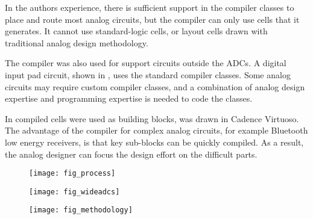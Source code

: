 {In the authors experience, there is sufficient support in the compiler classes
to place and route most analog circuits, but the compiler can only use
cells that it generates. It cannot use standard-logic cells, or
layout cells drawn with traditional analog design methodology.

The compiler was also used for support circuits
outside the ADCs. A digital input pad circuit, shown in , uses the standard compiler
classes. Some analog circuits may
require custom compiler classes, and a
combination of analog design expertise and programming expertise is
needed to code the classes.

In \cite{garvik15} compiled cells were used as building blocks,
was drawn in Cadence Virtuoso. The advantage of the compiler for
complex analog circuits, for example Bluetooth\textsuperscript{\textregistered} low
energy receivers, is that key sub-blocks can be quickly
compiled. As a result, the analog designer can focus the design effort on
the difficult parts.
}


\begin{figure}[tb]
\centerline{\texttt{[image: fig\_process]}}
\caption{}
\label{fig_cic}
\end{figure}


\begin{figure}[tb]
\centerline{\texttt{[image: fig\_wideadcs]}}
\caption{}
\label{fig_wideadcs}
\end{figure}



\begin{figure}[tb]
\centerline{\texttt{[image: fig\_methodology]}}
\caption{}
\label{fig_methodology}
\end{figure}

